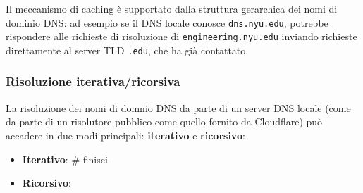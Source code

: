\documentclass[a4paper,11pt]{article}
\begin{document}
Il meccanismo di caching è supportato dalla struttura gerarchica dei nomi di dominio DNS: ad esempio se il DNS locale conosce \lstinline|dns.nyu.edu|, potrebbe rispondere alle richieste di risoluzione di \lstinline|engineering.nyu.edu| inviando richieste direttamente al server TLD \lstinline|.edu|, che ha già contattato.

\subsubsection{Risoluzione iterativa/ricorsiva}
La risoluzione dei nomi di domnio DNS da parte di un server DNS locale (come da parte di un risolutore pubblico come quello fornito da Cloudflare) può accadere in due modi principali: \textbf{iterativo} e \textbf{ricorsivo}:
\begin{itemize}
	\item \textbf{Iterativo}: # finisci
	\item \textbf{Ricorsivo}:
\end{itemize}
\end{document}
